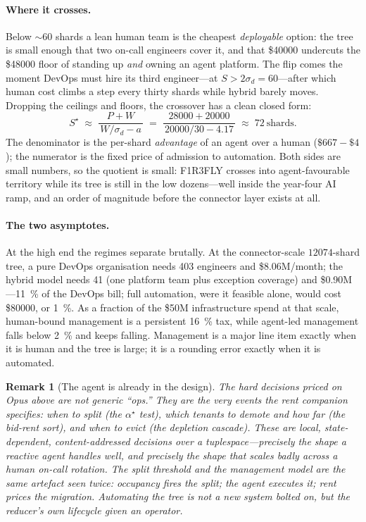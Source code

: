 \documentclass[11pt]{article}
\newcommand{\shards}{S}
\newcommand{\agentcost}{a}
\newtheorem{remark}{Remark}
\begin{document}
\paragraph{Where it crosses.} Below $\sim\!60$ shards a lean human team is the cheapest
\emph{deployable} option: the tree is small enough that two on-call engineers cover it, and that
\$\num{40000} undercuts the \$\num{48000} floor of standing up \emph{and} owning an agent platform.
The flip comes the moment DevOps must hire its third engineer---at $\shards>2\sigma_d=60$---after
which human cost climbs a step every thirty shards while hybrid barely moves. Dropping the ceilings
and floors, the crossover has a clean closed form:
\[
\shards^\star \;\approx\; \frac{P+W}{\,W/\sigma_d - \agentcost\,}
\;=\; \frac{\num{28000}+\num{20000}}{\,\num{20000}/30 - 4.17\,}
\;\approx\; \num{72}\ \text{shards}.
\]
The denominator is the per-shard \emph{advantage} of an agent over a human ($\$\num{667}-\$4$); the
numerator is the fixed price of admission to automation. Both sides are small numbers, so the
quotient is small: F1R3FLY crosses into agent-favourable territory while its tree is still in the
low dozens---well inside the year-four AI ramp, and an order of magnitude before the connector layer
exists at all.

\paragraph{The two asymptotes.} At the high end the regimes separate brutally. At the connector-scale
$\num{12074}$-shard tree, a pure DevOps organisation needs \num{403} engineers and
\$\num{8.06}M/month; the hybrid model needs \num{41} (one platform team plus exception coverage) and
\$\num{0.90}M---\SI{11}{\percent} of the DevOps bill; full automation, were it feasible alone, would
cost \$\num{80000}, or \SI{1}{\percent}. As a fraction of the \$\num{50}M infrastructure spend at
that scale, human-bound management is a persistent \SI{16}{\percent} tax, while agent-led management
falls below \SI{2}{\percent} and keeps falling. Management is a major line item exactly when it is
human and the tree is large; it is a rounding error exactly when it is automated.

\begin{remark}[The agent is already in the design]
The hard decisions priced on Opus above are not generic ``ops.'' They are the very events the rent
companion specifies: \emph{when to split} (the $\alpha^\star$ test), \emph{which tenants to demote}
and \emph{how far} (the bid-rent sort), and \emph{when to evict} (the depletion cascade). These are
local, state-dependent, content-addressed decisions over a tuplespace---precisely the shape a
reactive agent handles well, and precisely the shape that scales badly across a human on-call
rotation. The split threshold and the management model are the same artefact seen twice: occupancy
fires the split; the agent executes it; rent prices the migration. Automating the tree is not a new
system bolted on, but the reducer's own lifecycle given an operator.
\end{remark}
\end{document}
